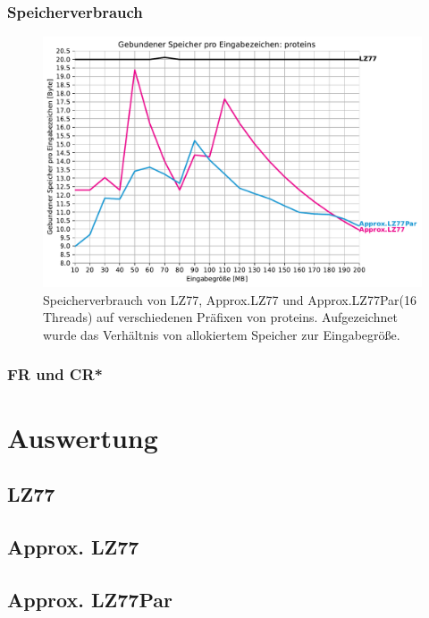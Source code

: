 \subsubsection{Speicherverbrauch}
\begin{figure}[ht]
    \centering
    \caption{Speicherverbrauch von LZ77, Approx.LZ77 und Approx.LZ77Par(16 Threads) auf verschiedenen Präfixen von proteins. Aufgezeichnet wurde das Verhältnis
    von allokiertem Speicher zur Eingabegröße.}
    \includegraphics[scale=0.6]{Images/progressive_mem.pdf}
\end{figure}
\subsubsection{FR und CR*}

\section{Auswertung}
\subsection{LZ77}
\subsection{Approx. LZ77}
\subsection{Approx. LZ77Par}